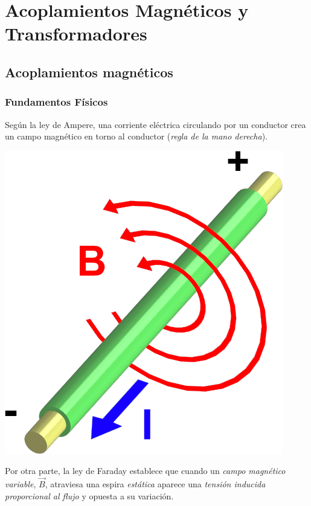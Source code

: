 \chapter{Acoplamientos Magnéticos y Transformadores}\label{chap.transformadores}

\section{Acoplamientos magnéticos}
\label{sec:acoplamientos}

\subsection{Fundamentos Físicos}
\label{sec:fisica-bobina}

Según la ley de Ampere, una corriente eléctrica circulando por un conductor crea un campo magnético en torno al conductor (\emph{regla de la mano derecha}).

\begin{center}
\includegraphics[height=0.2\textheight]{../figs/Electromagnetism.png}
\end{center}

Por otra parte, la ley de Faraday establece que cuando un \emph{campo magnético variable}, $\vec{B}$, atraviesa una espira \emph{estática} aparece una \emph{tensión inducida} \emph{proporcional al flujo} y opuesta a su variación.


